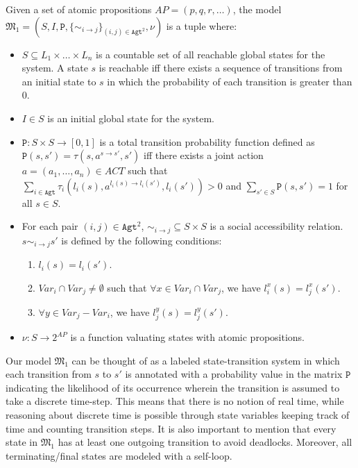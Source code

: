 \begin{definition}[Models]\label{def:models}
Given a set of atomic propositions $AP = (p,q,r, \ldots)$, the
model $\mathfrak{M_1}=(S,I,\texttt{P},\{\sim_{i \rightarrow
j}\}_{{(i,j)}\in \texttt{Agt}^2},\nu)$ is a tuple where:
%
\begin{itemize}
\item  $S \subseteq L_1 \times \ldots \times L_n$ is a countable
set of all reachable global states for the system. A state $s$ is
reachable iff there exists a sequence of transitions from an
initial state to $s$ in which the probability of each transition
is greater than $0$.

\item  $I \in S$ is an initial global state for the system.


\item  $\texttt{P}:S\times S\rightarrow [0,1]$ is a total
transition probability function defined as $\texttt{P}(s,
s')=\tau(s,a^{s \rightarrow s'}, s')$ iff there exists a joint
action $a=(a_1,\ldots,a_n) \in ACT$ such that \\
$\sum_{i \in \texttt{Agt}} \tau_i(l_i(s),a^{l_i(s)\rightarrow l_i(s')},l_i(s')) > 0$ and $\sum_{s' \in S} \texttt{P}(s,s') =1$
for all $s \in S$.


\item For each pair $(i,j) \in \texttt{Agt}^2$,
$\sim_{i\rightarrow j} \subseteq S \times S$ is a social accessibility relation. $s \sim_{i\rightarrow j} s'$ is defined by the following conditions:
  \begin{enumerate}
       \item $l_i(s)=l_i(s')$.
       \item $Var_i \cap Var_j \neq \emptyset$ such that $\forall x \in Var_i \cap Var_j$, we have $l^{x}_i(s)\!=\!l^{x}_j(s')$.
       \item $\forall y \in Var_j\!-\! Var_i$, we have $l^{y}_j(s)\!=\!l^{y}_j(s')$.
  \end{enumerate}
  \item  $\nu : S\rightarrow 2^{AP}$ is a function valuating states with atomic propositions.
\end{itemize}
\end{definition}


\noindent Our model $\mathfrak{M_1}$ can be thought of as a labeled
state-transition system in which each transition from $s$ to $s'$
is annotated with a probability value in the matrix
$\texttt{P}$ indicating the likelihood of its occurrence
wherein the transition is assumed to take a discrete time-step.
This means that there is no notion of real time, while reasoning
about discrete time is possible through state variables keeping
track of time and counting transition steps. It is also important to
mention that every state in $\mathfrak{M_1}$ has at least one
outgoing transition to avoid deadlocks. Moreover, all
terminating/final states are modeled with a self-loop.



